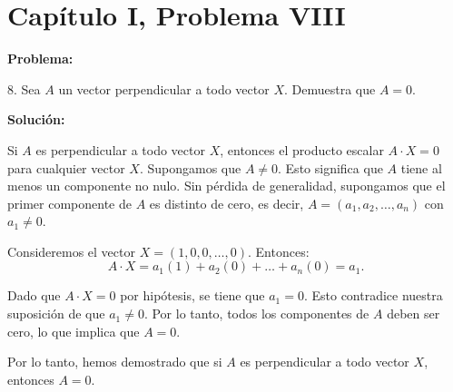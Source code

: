 \section*{Capítulo I, Problema VIII}

\textbf{Problema:}

8. Sea $A$ un vector perpendicular a todo vector $X$. Demuestra que $A = 0$.

\textbf{Solución:}

Si $A$ es perpendicular a todo vector $X$, entonces el producto escalar $A \cdot X = 0$ para cualquier vector $X$. Supongamos que $A \neq 0$. Esto significa que $A$ tiene al menos un componente no nulo. Sin pérdida de generalidad, supongamos que el primer componente de $A$ es distinto de cero, es decir, $A = (a_1, a_2, \dots, a_n)$ con $a_1 \neq 0$.

Consideremos el vector $X = (1, 0, 0, \dots, 0)$. Entonces:
\[
    A \cdot X = a_1(1) + a_2(0) + \dots + a_n(0) = a_1.
\]

Dado que $A \cdot X = 0$ por hipótesis, se tiene que $a_1 = 0$. Esto contradice nuestra suposición de que $a_1 \neq 0$. Por lo tanto, todos los componentes de $A$ deben ser cero, lo que implica que $A = 0$.

Por lo tanto, hemos demostrado que si $A$ es perpendicular a todo vector $X$, entonces $A = 0$. 
